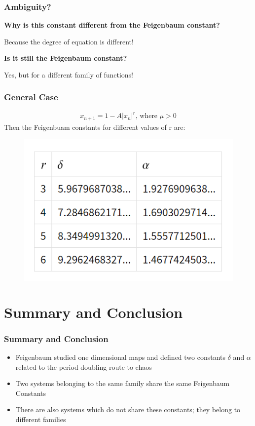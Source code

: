 \documentclass[
	11pt, %
	aspectratio=169, %
]{beamer}
\begin{document}

\begin{frame}
        \frametitle{Ambiguity?}
        \begin{center}
        \item \textbf{\large{Why is this constant different from the Feigenbaum constant?}} \pause
        \item Because the degree of equation is different!
        \item \textbf{\large{Is it still the Feigenbaum constant?}} \pause
        \item Yes, but for a different family of functions!
        \end{center}

\end{frame}


\begin{frame}
        \frametitle{General Case}
        \begin{align*}
            x_{n+1} = 1 - A |x_{n}|^{r} \text{, where $\mu > 0$}
        \end{align*}
        Then the Feigenbuam constants for different values of r  are:
        \begin{figure}
            \includegraphics[width=0.4\linewidth]
            {feigenbaum_for_different_r.png}
        \end{figure}
        \vspace{-5mm}
\end{frame}

\section{Summary and Conclusion}

\begin{frame}
        \frametitle{Summary and Conclusion}
        \begin{itemize}
        \item Feigenbaum studied one dimensional maps and defined two constants $\delta$ and $\alpha$ related to the period doubling route to chaos
        \item Two systems belonging to the same family share the same Feigenbaum Constants
        \item There are also systems which do not share these constants; they belong to different families
        \end{itemize}
\end{frame}
\end{document}
